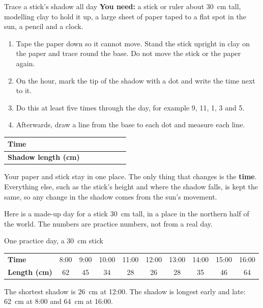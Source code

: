 \begin{tryit}{Trace a stick's shadow all day}
\textbf{You need:} a stick or ruler about 30~cm tall, modelling clay to hold it up, a large sheet of paper taped to a flat spot in the sun, a pencil and a clock.
\begin{enumerate}[leftmargin=1.6em]
\item Tape the paper down so it cannot move. Stand the stick upright in clay on the paper and trace round the base. Do not move the stick or the paper again.
\item On the hour, mark the tip of the shadow with a dot and write the time next to it.
\item Do this at least five times through the day, for example 9, 11, 1, 3 and 5.
\item Afterwards, draw a line from the base to each dot and measure each line.
\end{enumerate}
\par\medskip
\renewcommand{\arraystretch}{1.6}
\begin{tabular}{|l|c|c|c|c|c|c|}
\hline
\textbf{Time} & & & & & & \\ \hline
\textbf{Shadow length (cm)} & & & & & & \\ \hline
\end{tabular}
\end{tryit}

Your paper and stick stay in one place. The only thing that changes is the \textbf{time}. Everything else, such as the stick's height and where the shadow falls, is kept the same, so any change in the shadow comes from the sun's movement.

\clearpage

Here is a made-up day for a stick 30~cm tall, in a place in the northern half of the world. The numbers are practice numbers, not from a real day.

\begin{worked}{One practice day, a 30~cm stick}
\begin{center}\sffamily\small\renewcommand{\arraystretch}{1.2}
\begin{tabular}{@{}l*{9}{c}@{}}
\textbf{Time} & 8:00 & 9:00 & 10:00 & 11:00 & 12:00 & 13:00 & 14:00 & 15:00 & 16:00\\
\textbf{Length (cm)} & 62 & 45 & 34 & 28 & 26 & 28 & 35 & 46 & 64
\end{tabular}
\end{center}
The shortest shadow is 26~cm at 12:00. The shadow is longest early and late: 62~cm at 8:00 and 64~cm at 16:00.
\end{worked}

